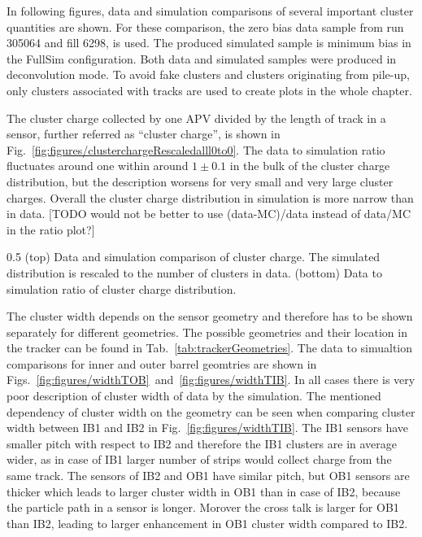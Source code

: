 In following figures, data and simulation comparisons of several important cluster quantities are shown. For these comparison, the zero bias data sample from run 305064 and fill 6298, is used. The produced simulated sample is minimum bias in the FullSim configuration. Both data and simulated samples were produced in deconvolution mode. To avoid fake clusters and clusters originating from pile-up, only clusters associated with tracks are used to create plots in the whole chapter.
 
The cluster charge collected by one APV divided by the length of track in a sensor, further referred as ``cluster charge'', is shown in Fig.~\ref{fig:figures/clusterchargeRescaledalll0to0}. The data to simulation ratio fluctuates around one within around $1 \pm 0.1$ in the bulk of the cluster charge distribution, but the description worsens for very small and very large cluster charges. Overall the cluster charge distribution in simulation is more narrow than in data. [TODO would not be better to use (data-MC)/data instead of data/MC in the ratio plot?]

                 {0.5}       %
                 { (top) Data and simulation comparison of cluster charge. The simulated distribution is rescaled to the number of clusters in data. (bottom) Data to simulation ratio of cluster charge distribution. }

The cluster width depends on the sensor geometry and therefore has to be shown separately for different geometries. The possible geometries and their location in the tracker can be found in Tab.~\ref{tab:trackerGeometries}. The data to simualtion comparisons for inner and outer barrel geomtries are shown in Figs.~\ref{fig:figures/widthTOB}~and~\ref{fig:figures/widthTIB}. In all cases there is very poor description of cluster width of data by the simulation. The mentioned dependency of cluster width on the geometry can be seen when comparing cluster width between IB1 and IB2 in Fig.~\ref{fig:figures/widthTIB}. The IB1 sensors have smaller pitch with respect to IB2 and therefore the IB1 clusters are in average wider, as in case of IB1 larger number of strips would collect charge from the same track. The sensors of IB2 and OB1 have similar pitch, but OB1 sensors are thicker which leads to larger cluster width in OB1 than in case of IB2, because the particle path in a sensor is longer. Morover the cross talk is larger for OB1 than IB2, leading to larger enhancement in OB1 cluster width compared to IB2.

